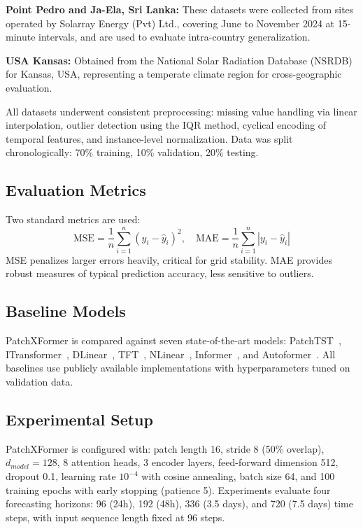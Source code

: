 \documentclass[a4paper,fleqn]{cas-dc}
\begin{document}
\textbf{Point Pedro and Ja-Ela, Sri Lanka:} These datasets were collected from sites operated by Solarray Energy (Pvt) Ltd., covering June to November 2024 at 15-minute intervals, and are used to evaluate intra-country generalization.

\textbf{USA Kansas:} Obtained from the National Solar Radiation Database (NSRDB)~\cite{NSRDB} for Kansas, USA, representing a temperate climate region for cross-geographic evaluation.

All datasets underwent consistent preprocessing: missing value handling via linear interpolation, outlier detection using the IQR method, cyclical encoding of temporal features, and instance-level normalization. Data was split chronologically: 70\% training, 10\% validation, 20\% testing.

\subsection{Evaluation Metrics}

Two standard metrics are used:
\begin{equation}
\text{MSE} = \frac{1}{n} \sum_{i=1}^{n} (y_i - \hat{y}_i)^2, \quad
\text{MAE} = \frac{1}{n} \sum_{i=1}^{n} |y_i - \hat{y}_i|
\end{equation}
MSE penalizes larger errors heavily, critical for grid stability. MAE provides robust measures of typical prediction accuracy, less sensitive to outliers.

\subsection{Baseline Models}

PatchXFormer is compared against seven state-of-the-art models: PatchTST~\cite{nie2022patchtst}, ITransformer~\cite{liu2023itransformer}, DLinear~\cite{zeng2023transformers}, TFT~\cite{lim2021temporal}, NLinear~\cite{zeng2023transformers}, Informer~\cite{zhou2021informer}, and Autoformer~\cite{wu2021autoformer}. All baselines use publicly available implementations with hyperparameters tuned on validation data.

\subsection{Experimental Setup}

PatchXFormer is configured with: patch length 16, stride 8 (50\% overlap), $d_{model}=128$, 8 attention heads, 3 encoder layers, feed-forward dimension 512, dropout 0.1, learning rate $10^{-4}$ with cosine annealing, batch size 64, and 100 training epochs with early stopping (patience 5). Experiments evaluate four forecasting horizons: 96 (24h), 192 (48h), 336 (3.5 days), and 720 (7.5 days) time steps, with input sequence length fixed at 96 steps.
\end{document}
